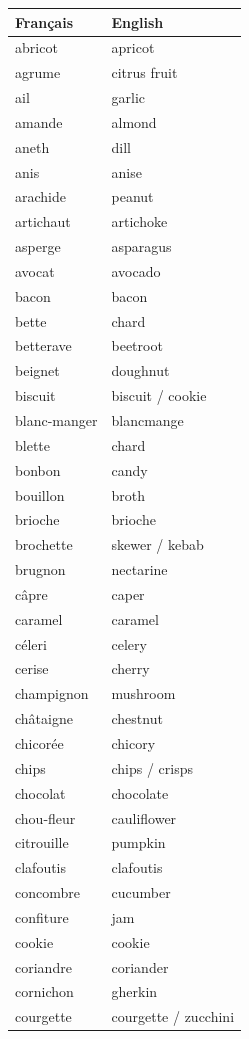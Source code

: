 \documentclass[12pt,a4paper]{article}
\begin{document}
\begin{longtable}{p{4cm} p{6cm}}
\toprule
\textbf{Français} & \textbf{English} \\
\midrule
abricot & apricot \\
agrume & citrus fruit \\
ail & garlic \\
amande & almond \\
aneth & dill \\
anis & anise \\
arachide & peanut \\
artichaut & artichoke \\
asperge & asparagus \\
avocat & avocado \\
bacon & bacon \\
bette & chard \\
betterave & beetroot \\
beignet & doughnut \\
biscuit & biscuit / cookie \\
blanc-manger & blancmange \\
blette & chard \\
bonbon & candy \\
bouillon & broth \\
brioche & brioche \\
brochette & skewer / kebab \\
brugnon & nectarine \\
câpre & caper \\
caramel & caramel \\
céleri & celery \\
cerise & cherry \\
champignon & mushroom \\
châtaigne & chestnut \\
chicorée & chicory \\
chips & chips / crisps \\
chocolat & chocolate \\
chou-fleur & cauliflower \\
citrouille & pumpkin \\
clafoutis & clafoutis \\
concombre & cucumber \\
confiture & jam \\
cookie & cookie \\
coriandre & coriander \\
cornichon & gherkin \\
courgette & courgette / zucchini \\

\end{longtable}
\end{document}
